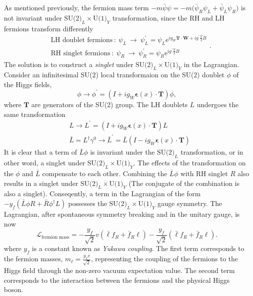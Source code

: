 As mentioned previously, the fermion mass term $-m\bar{\psi}\psi=-m\big(\bar{\psi}_{R}\psi_{L}+\bar{\psi}_{L}\psi_{R}\big)$ is not invariant under $\text{SU(2)}_{L}\times \text{U(1)}_{Y}$ transformation, since the RH and LH fermions transform differently
\begin{equation}
\begin{split}
& \text{LH doublet fermions}\ :\ \psi_{L}\ \to\ \psi_{L}^{\prime}=\psi_{L}\mathrm{e}^{ig_{W}\boldsymbol{T}\cdot\boldsymbol{W}+ig^{\prime}\frac{Y}{2}B} \\
& \text{RH singlet fermions}\ :\ \psi_{R}\ \to\ \psi_{R}^{\prime}=\psi_{R}\mathrm{e}^{ig^{\prime}\frac{Y}{2}B}
\end{split}
.
\end{equation}
The solution is to construct a \emph{singlet} under $\text{SU(2)}_{L}\times \text{U(1)}_{Y}$ in the Lagrangian.
Consider an infinitesimal SU(2) local transformaion on the SU(2) doublet $\phi$ of the Higgs fields,
\begin{equation}
\phi\to\phi^{\prime}=(I+ig_{W}\boldsymbol{\epsilon}(x)\cdot\boldsymbol{T})\phi,
\end{equation} 
where $\boldsymbol{T}$ are generators of the SU(2) group. 
The LH doublets $L$ undergoes the same transformation
\begin{equation}
\begin{split}
& L\to L^{\prime}=(I+ig_{W}\boldsymbol{\epsilon}(x)\cdot\boldsymbol{T})L \\
& \bar{L}=L^{\dagger}\gamma^{0}\to \bar{L}^{\prime} = \bar{L}(I-ig_{W}\boldsymbol{\epsilon}(x)\cdot\boldsymbol{T})
\end{split}
\end{equation}
It is clear that a term of $\bar{L}\phi$ is invariant under the $\text{SU(2)}_{L}$ transformation, or in other word, a singlet under $\text{SU(2)}_{L}\times \text{U(1)}_{Y}$. The effects of the transformation on the $\phi$ and $\bar{L}$ compensate to each other.
Combining the $\bar{L}\phi$ with RH singlet $R$ also results in a singlet under $\text{SU(2)}_{L}\times \text{U(1)}_{Y}$ (The conjugate of the combination is also a singlet).
Conseqently, a term in the Lagrangian of the form $-y_{f}(\bar{L}\phi R+ \bar{R}\phi^{\dagger}L)$ possesses the $\text{SU(2)}_{L}\times \text{U(1)}_{Y}$ gauge symmetry.
The Lagrangian, after spontaneous symmetry breaking and in the unitary gauge, is now 
\begin{equation}
\label{eqn:Lagrangian_fermionmass}
\mathcal{L}_{\text{fermion mass}} = -\frac{y_{f}}{\sqrt{2}}v(\bar{\ell}f_{R}+\bar{f}_{R}\ell)-\frac{y_{f}}{\sqrt{2}}(\bar{\ell}f_{R}+\bar{f}_{R}\ell).
\end{equation}
where $y_{f}$ is a constant known as \emph{Yukawa coupling}.
The first term corresponds to the fermion masses, $m_{\ell}=\frac{y_{f}v}{\sqrt{2}}$, representing the coupling of the fermions to the Higgs field through the non-zero vacuum expectation value. The second term corresponds to the interaction between the fermions and the physical Higgs boson.

